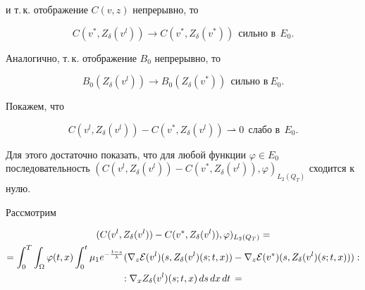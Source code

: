 \begin{pf}
и т.\,к. отображение $C(v,z)$ непрерывно, то


\begin{equation}\label{e59}


C(v^*, Z_{\delta}(v^l)) \to C(v^*, Z_{\delta}(v^*))


\ \ \text{сильно в}\ \ E_0.


\end{equation}


Аналогично, т.\,к. отображение $B_0$ непрерывно, то


$$


B_0(Z_{\delta}(v^l)) \to B_0(Z_{\delta}(v^*))


\ \ \text{сильно в}\ E_0.


$$





Покажем, что


\begin{equation}\label{e510}


C(v^l, Z_{\delta}(v^l)) -


C(v^*, Z_{\delta}(v^l))\rightharpoonup 0 \ \ \text{слабо в}\ \ E_0.


\end{equation}


Для этого достаточно показать, что для любой функции $\varphi


\in E_0$ последовательность $(C(v^l, Z_{\delta}(v^l))-C(v^*,


Z_{\delta}(v^l)), \varphi)_{L_2(Q_T)}$ сходится к нулю.





Рассмотрим


\begin{gather*}


(C(v^l, Z_{\delta}(v^l))-C(v^*, Z_{\delta}(v^l)), \varphi)_{L_2(Q_T)}=\\


%


=\intl 0 T \intl{\Om}{}\varphi(t,x) \intl 0 t \mu_1


e^{-\frac{t-s}{\lambda}}(\nabla_z


\E(v^l)(s,Z_{\delta}(v^l)(s;t,x))-\nabla_z


\E(v^*)(s,Z_{\delta}(v^l)(s;t,x))):\\


%


: \nabla_x Z_{\delta}(v^l)(s;t,x)\,ds\,dx\,dt\,=\\



\end{gather*}
\end{pf}
